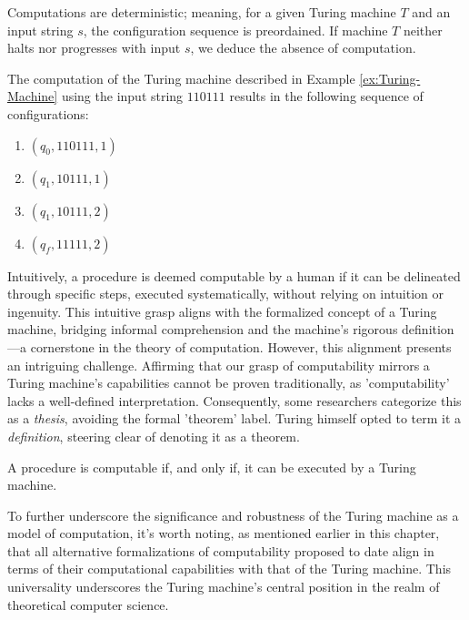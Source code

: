 Computations are deterministic; meaning, for a given Turing machine $T$ and an input string $s$, the configuration sequence is preordained. If machine $T$ neither halts nor progresses with input $s$, we deduce the absence of computation.

\begin{example}
The computation of the Turing machine described in Example \ref{ex:Turing-Machine} using the input string $110111$ results in the following sequence of configurations:

\begin{enumerate}
\item $(q_0, 110111, 1)$
\item $(q_1, 10111,  1)$
\item $(q_1, 10111,  2)$  
\item $(q_f, 11111,  2)$  
\end{enumerate}

\end{example}

Intuitively, a procedure is deemed computable by a human if it can be delineated through specific steps, executed systematically, without relying on intuition or ingenuity. This intuitive grasp aligns with the formalized concept of a Turing machine, bridging informal comprehension and the machine's rigorous definition—a cornerstone in the theory of computation. However, this alignment presents an intriguing challenge. Affirming that our grasp of computability mirrors a Turing machine's capabilities cannot be proven traditionally, as 'computability' lacks a well-defined interpretation. Consequently, some researchers categorize this as a \emph{thesis}, avoiding the formal 'theorem' label. Turing himself opted to term it a \emph{definition}, steering clear of denoting it as a theorem.

\begin{theorem}
\label{th:turing_thesis}
A procedure is computable if, and only if, it can be executed by a Turing machine.
\end{theorem}

To further underscore the significance and robustness of the Turing machine as a model of computation, it's worth noting, as mentioned earlier in this chapter, that all alternative formalizations of computability proposed to date align in terms of their computational capabilities with that of the Turing machine. This universality underscores the Turing machine's central position in the realm of theoretical computer science.

